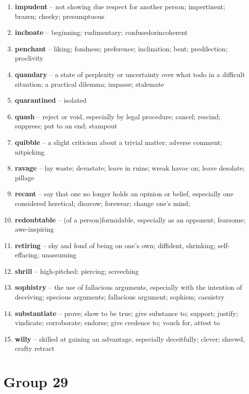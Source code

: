 \begin{enumerate}[wide,labelindent=0pt]
\item \textbf{impudent} -- not showing due respect for another person;  impertinent; brazen; cheeky; presumptuous
\item \textbf{inchoate} -- beginning; rudimentary; confusedorincoherent
\item \textbf{penchant} -- liking;  fondness; preference; inclination; bent; predilection; proclivity
\item \textbf{quandary} -- a state of perplexity or uncertainty over what todo in a difficult situation; a practical dilemma; impasse; stalemate
\item \textbf{quarantined} -- isolated
\item \textbf{quash} -- reject or void, especially by legal procedure;  cancel; rescind; suppress; put to an end; stampout
\item \textbf{quibble} -- a slight criticism about a trivial matter; adverse comment; nitpicking
\item \textbf{ravage} -- lay waste; devastate; leave in ruins; wreak havoc on; leave desolate; pillage
\item \textbf{recant} -- say that one no longer holds an opinion or belief, especially one considered heretical; disavow; forswear; change one's mind;
\item \textbf{redoubtable} -- (of a person)formidable, especially as an opponent; fearsome; awe-inspiring
\item \textbf{retiring} -- shy and fond of being on one's own;  diffident, shrinking; self-effacing; unassuming
\item \textbf{shrill} -- high-pitched; piercing; screeching
\item \textbf{sophistry} -- the use of fallacious arguments, especially with the intention of deceiving; specious arguments; fallacious argument; sophism; casuistry
\item \textbf{substantiate} -- prove;  show to be true;  give substance to; support; justify; vindicate; corroborate; endorse; give credence to; vouch for, attest to
\item \textbf{willy} -- skilled at gaining an advantage, especially deceitfully; clever; shrewd, crafty
retract
\end{enumerate}

\newpage
\section{Group 29}


